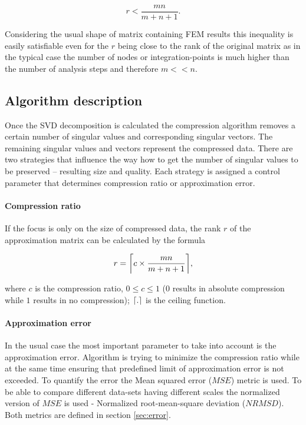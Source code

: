 $$r<\frac{m n}{m+n+1}.$$

\noindent
Considering the usual shape of matrix containing FEM results this inequality is easily satisfiable even for the $r$ being close to the rank of the original matrix as in the typical case the number of nodes or integration-points is much higher than the number of analysis steps and therefore $m<<n$.

\subsection{Algorithm description}
Once the SVD decomposition is calculated the compression algorithm removes a certain number of singular values and corresponding singular vectors. The remaining singular values and vectors represent the compressed data. There are two strategies that influence the way how to get the number of singular values to be preserved -- resulting size and quality. Each strategy is assigned a control parameter that determines compression ratio or approximation error.

\paragraph{Compression ratio}
If the focus is only on the size of compressed data, the rank $r$ of the approximation matrix can be calculated by the formula

\begin{equation}
r=\ceil*{c \times \frac{m n}{m+n+1}},
\end{equation}

\noindent
where $c$ is the compression ratio, $0 \leq c \leq 1$ ($0$ results in absolute compression while $1$ results in no compression); $\ceil*{.}$ is the ceiling function.

\paragraph{Approximation error}
In the usual case the most important parameter to take into account is the approximation error. Algorithm is trying to minimize the compression ratio while at the same time ensuring that predefined limit of approximation error is not exceeded. To quantify the error the Mean squared error ($MSE$) metric is used. To be able to compare different data-sets having different scales the normalized version of $MSE$ is used - Normalized root-mean-square deviation ($NRMSD$). Both metrics are defined in section \ref{sec:error}.

